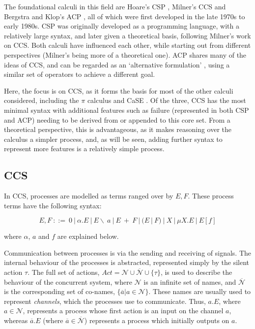 The foundational calculi in this field are Hoare's CSP \cite{hoare:csp78},
Milner's CCS \cite{milner:ccs} and Bergstra and Klop's ACP \cite{acp}, all of
which were first developed in the late 1970s to early 1980s.  CSP was
originally developed as a programming language, with a relatively large
syntax, and later given a theoretical basis, following Milner's work on
CCS.  Both calculi have influenced each other, while starting out from
different perspectives (Milner's being more of a theoretical one).  ACP
shares many of the ideas of CCS, and can be regarded as an
`alternative formulation' \cite{acp}, using a similar set of operators
to achieve a different goal.

Here, the focus is on CCS, as it forms the basis for most of the other
calculi considered, including the $\pi$ calculus
\cite{picalctutorial} and CaSE \cite{CaSE}.  Of the three, CCS has the
most minimal syntax with additional features such as failure
(represented in both CSP and ACP) needing to be derived from or appended to
this core set.  From a theoretical perspective, this is advantageous, as
it makes reasoning over the calculus a simpler process, and, as will be
seen, adding further syntax to represent more features is a relatively
simple process.

\subsection{CCS}
\label{ccs}

In CCS, processes are modelled as terms ranged over by $E, F$.  These
process terms have the following syntax:

\begin{equation}
\label{ccssyntax}
  E, F\ ::=\ 
  0\ |\ 
  \alpha.E\ |\ 
  E\backslash\ a\ |\ 
  E\ +\ F\ |\ 
  (E\ |\ F)\ |\ 
  X\ |\ 
  \mu X.E\ |\ 
  E[f] 
\end{equation}

\noindent where $\alpha$, $a$ and $f$ are explained below.

Communication between processes is via the sending and receiving of
signals.  The internal behaviour of the processes is abstracted,
represented simply by the silent action $\tau$.  The full set of
actions, $Act = \mathcal{N} \cup \overline{\mathcal{N}} \cup
\{\tau\}$, is used to describe the behaviour of the concurrent system,
where $\mathcal{N}$ is an infinite set of names, and
$\overline{\mathcal{N}}$ is the corresponding set of co-names,
$\{\overline{a} | a \in \mathcal{N}\}$.  These names are usually used
to represent \emph{channels}, which the processes use to communicate.
Thus, $a.E$, where $a \in \mathcal{N}$, represents a process whose
first action is an input on the channel $a$, whereas $\overline{a}.E$
(where $\overline{a} \in \overline{\mathcal{N}}$) represents a process
which initially outputs on $a$.

